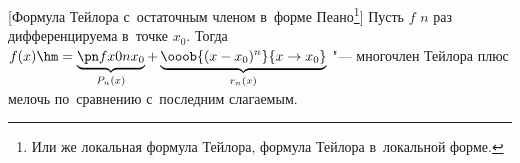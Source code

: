 [Формула Тейлора с~остаточным членом в~форме Пеано\footnote{Или же локальная формула Тейлора, формула Тейлора в~локальной форме.}] Пусть
$f$ $n$ раз дифференцируема в~точке $x_0$. Тогда $f(x)\hm=\underbrace{\pn fx0n{x_0}}_{P_n(x)}+\underbrace{\vphantom{\pn fx0n{x_0}}\ooob{(x-x_0)^n}{x\to x_0}}_{r_n(x)}$ "---
многочлен Тейлора плюс мелочь  по~сравнению с~последним слагаемым.

